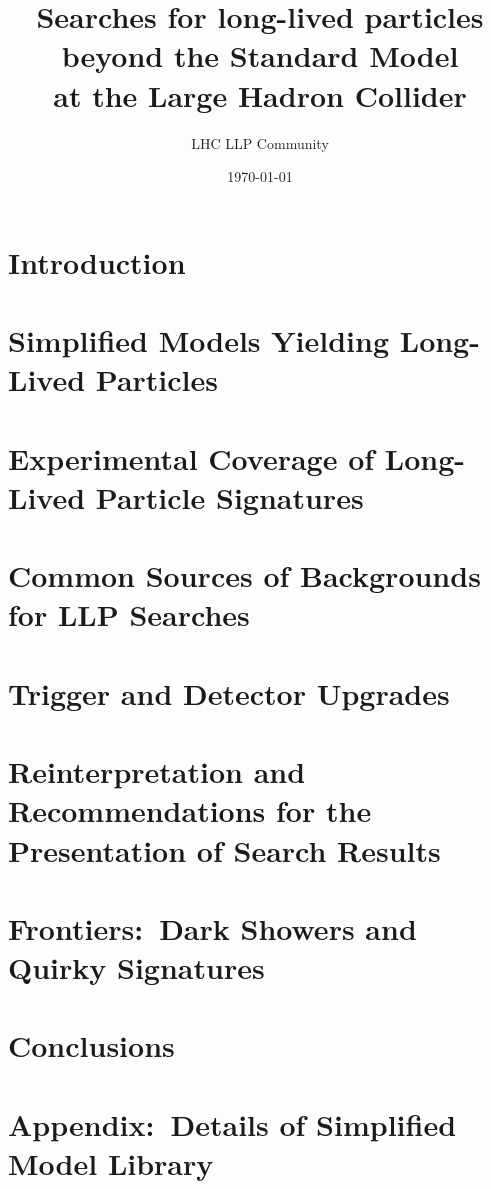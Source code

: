 \documentclass[a4paper,notitlepage,nobib]{tufte-book}
\title{Searches for long-lived particles beyond the Standard Model \\ \smallskip \noindent at the Large Hadron Collider}
\author{LHC LLP Community}
\date{\today}
\begin{document}
\setcounter{secnumdepth}{3} %



\setcounter{tocdepth}{1}
\tableofcontents





\chapter{Introduction}
\label{sec:Introduction}


\chapter{Simplified Models Yielding Long-Lived Particles}
\label{sec:simplifiedmodel}


\chapter{Experimental Coverage of Long-Lived Particle Signatures}
\label{sec:experimentcoverage}


\chapter{Common Sources of Backgrounds for LLP Searches}
\label{sec:backgrounds}


\chapter{Trigger and Detector Upgrades}
\label{sec:triggers}


\chapter{Reinterpretation and Recommendations for the Presentation of Search Results}
\label{sec:reint}









\chapter{Frontiers:~Dark Showers and Quirky Signatures}
\label{sec:showers}


\chapter{Conclusions}
\label{sec:conclusions}


\appendix

\chapter{Appendix:~Details of Simplified Model Library}
\label{sec:library_more}


\printbibliography
\end{document}
